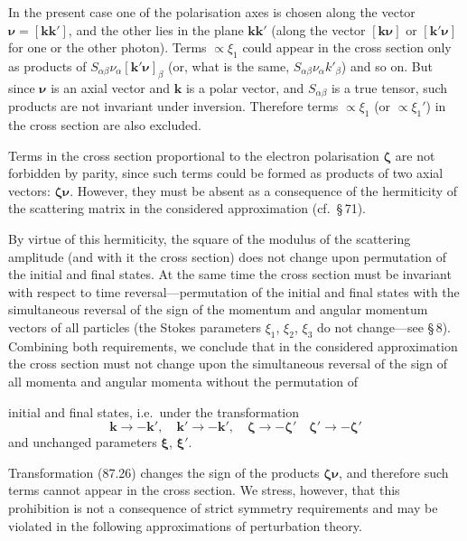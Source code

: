 In the present case one of the polarisation axes is chosen along the vector $\boldsymbol{\nu} = [\mathbf{kk}']$, and the other lies in the plane $\mathbf{kk}'$ (along the vector $[\mathbf{k}\boldsymbol{\nu}]$ or $[\mathbf{k}'\boldsymbol{\nu}]$ for one or the other photon). Terms $\propto \xi_1$ could appear in the cross section only as products of $S_{\alpha\beta}\nu_\alpha[\mathbf{k}'\boldsymbol{\nu}]_\beta$ (or, what is the same, $S_{\alpha\beta}\nu_\alpha k'_\beta$) and so on. But since $\boldsymbol{\nu}$ is an axial vector and $\mathbf{k}$ is a polar vector, and $S_{\alpha\beta}$ is a true tensor, such products are not invariant under inversion. Therefore terms $\propto \xi_1$ (or $\propto \xi_1'$) in the cross section are also excluded.

Terms in the cross section proportional to the electron polarisation $\boldsymbol{\zeta}$ are not forbidden by parity, since such terms could be formed as products of two axial vectors: $\boldsymbol{\zeta}\boldsymbol{\nu}$. However, they must be absent as a consequence of the hermiticity of the scattering matrix in the considered approximation (cf.\ \S\,71).

By virtue of this hermiticity, the square of the modulus of the scattering amplitude (and with it the cross section) does not change upon permutation of the initial and final states. At the same time the cross section must be invariant with respect to time reversal---permutation of the initial and final states with the simultaneous reversal of the sign of the momentum and angular momentum vectors of all particles (the Stokes parameters $\xi_1$, $\xi_2$, $\xi_3$ do not change---see \S\,8). Combining both requirements, we conclude that in the considered approximation the cross section must not change upon the simultaneous reversal of the sign of all momenta and angular momenta without the permutation of


initial and final states, i.e.\ under the transformation
\begin{equation}
\mathbf{k} \to -\mathbf{k}', \quad \mathbf{k}' \to -\mathbf{k}', \quad \boldsymbol{\zeta} \to -\boldsymbol{\zeta}' \quad \boldsymbol{\zeta}' \to -\boldsymbol{\zeta}'
\label{eq:87.26}
\end{equation}
and unchanged parameters $\boldsymbol{\xi}$, $\boldsymbol{\xi}'$.

Transformation (87.26) changes the sign of the products $\boldsymbol{\zeta\nu}$, and therefore such terms cannot appear in the cross section. We stress, however, that this prohibition is not a consequence of strict symmetry requirements and may be violated in the following approximations of perturbation theory.

